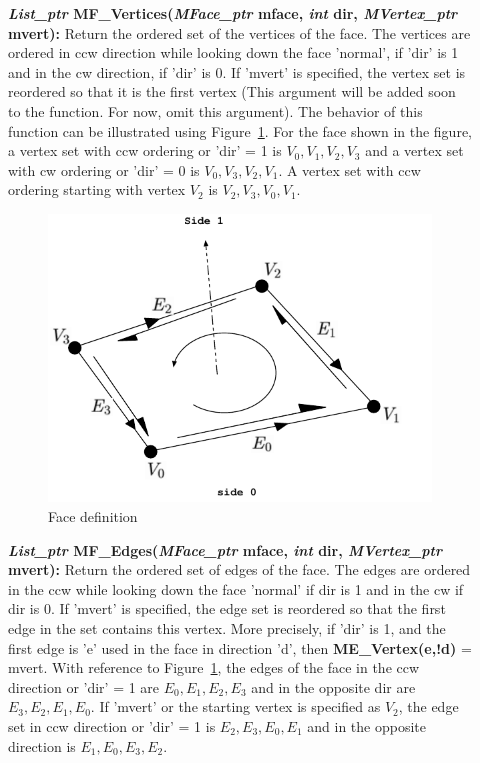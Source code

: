 \documentclass[12pt]{article}
\begin{document}
\begin{description}
\item[]\textbf{\textit{List\_ptr} MF\_Vertices(\textit{MFace\_ptr}
    mface, \textit{int} dir, \textit{MVertex\_ptr} mvert):} Return the
  ordered set of the vertices of the face. The vertices are ordered in
  ccw direction while looking down the face 'normal', if 'dir' is 1
  and in the cw direction, if 'dir' is 0. If 'mvert' is specified, the
  vertex set is reordered so that it is the first vertex (This
  argument will be added soon to the function. For now, omit this
  argument). The behavior of this function can be illustrated using
  Figure~\ref{fig:face_def}. For the face shown in the figure, a
  vertex set with ccw ordering or 'dir' = 1 is ${V_0,V_1,V_2,V_3}$ and
  a vertex set with cw ordering or 'dir' = 0 is ${V_0,V_3,V_2,V_1}$.
  A vertex set with ccw ordering starting with vertex $V_2$ is
  ${V_2,V_3,V_0,V_1}$.

\begin{figure}[!h]
  \begin{center}
  \includegraphics[scale=1.0]{figures/face_def} 
  \caption{Face definition}
  \label{fig:face_def}
  \end{center}
\end{figure}


\item[]\textbf{\textit{List\_ptr} MF\_Edges(\textit{MFace\_ptr} mface,
    \textit{int} dir, \textit{MVertex\_ptr} mvert):} Return the
  ordered set of edges of the face. The edges are ordered in the ccw
  while looking down the face 'normal' if dir is 1 and in the cw if
  dir is 0. If 'mvert' is specified, the edge set is reordered so that
  the first edge in the set contains this vertex. More precisely, if
  'dir' is 1, and the first edge is 'e' used in the face in direction
  'd', then \textbf{ME\_Vertex(e,!d)} = mvert. With reference to
  Figure~\ref{fig:face_def}, the edges of the face in the ccw direction or
  'dir' = 1 are ${E_0,E_1,E_2,E_3}$ and in the opposite dir are
  ${E_3,E_2,E_1,E_0}$. If 'mvert' or the starting vertex is specified
  as $V_2$, the edge set in ccw direction or 'dir' = 1 is
  ${E_2,E_3,E_0,E_1}$ and in the opposite direction is
  ${E_1,E_0,E_3,E_2}$.


\end{description}
\end{document}
